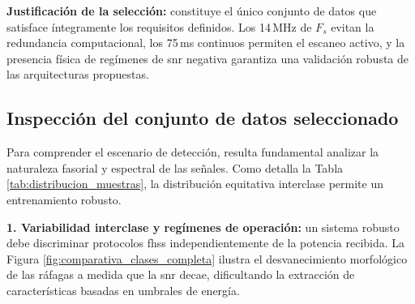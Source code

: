 \textbf{Justificación de la selección:} constituye el único conjunto de datos que satisface íntegramente los requisitos definidos. Los 14\,MHz de $F_s$ evitan la redundancia computacional, los 75\,ms continuos permiten el escaneo activo, y la presencia física de regímenes de \gls{snr} negativa garantiza una validación robusta de las arquitecturas propuestas.

\subsection{Inspección del conjunto de datos seleccionado}

Para comprender el escenario de detección, resulta fundamental analizar la naturaleza fasorial y espectral de las señales. Como detalla la Tabla \ref{tab:distribucion_muestras}, la distribución equitativa interclase permite un entrenamiento robusto.

\begin{table}[htbp]
\centering
\small
\caption{Distribución de muestras en el conjunto de datos NoisyUAV v2.}
\label{tab:distribucion_muestras}
\end{table}

\textbf{1. Variabilidad interclase y regímenes de operación:} un sistema robusto debe discriminar protocolos \gls{fhss} independientemente de la potencia recibida. La Figura \ref{fig:comparativa_clases_completa} ilustra el desvanecimiento morfológico de las ráfagas a medida que la \gls{snr} decae, dificultando la extracción de características basadas en umbrales de energía.

